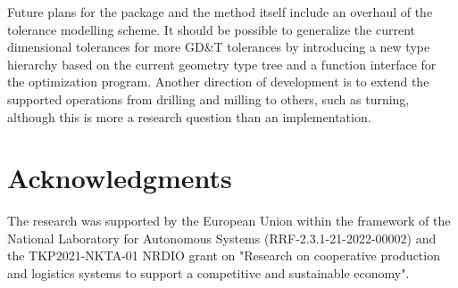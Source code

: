 \documentclass{juliacon}
\begin{document}
Future plans for the package and the method itself include an overhaul of the tolerance modelling scheme.
It should be possible to generalize the current dimensional tolerances for  more GD\&T tolerances by introducing a new type hierarchy based on the current geometry type tree and a function interface for the optimization program.
Another direction of development is to extend the supported operations from drilling and milling to others, such as turning, although this is more a research question than an implementation.

\section{Acknowledgments}
The research was supported by the European Union within the framework of the National Laboratory for Autonomous Systems (RRF-2.3.1-21-2022-00002) and the TKP2021-NKTA-01  NRDIO grant on "Research on cooperative production and logistics systems to support a competitive and sustainable economy".


\end{document}
